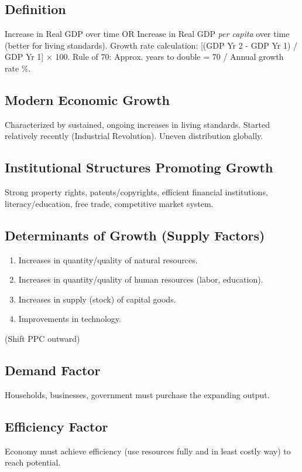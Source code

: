 \documentclass{article}
\begin{document}
\subsection*{Definition}
Increase in Real GDP over time OR Increase in Real GDP \textit{per capita} over time (better for living standards). Growth rate calculation: [(GDP Yr 2 - GDP Yr 1) / GDP Yr 1] $\times$ 100. Rule of 70: Approx. years to double = 70 / Annual growth rate \%.

\subsection*{Modern Economic Growth}
Characterized by sustained, ongoing increases in living standards. Started relatively recently (Industrial Revolution). Uneven distribution globally.

\subsection*{Institutional Structures Promoting Growth}
Strong property rights, patents/copyrights, efficient financial institutions, literacy/education, free trade, competitive market system.

\subsection*{Determinants of Growth (Supply Factors)}
\begin{enumerate}
    \item Increases in quantity/quality of natural resources.
    \item Increases in quantity/quality of human resources (labor, education).
    \item Increases in supply (stock) of capital goods.
    \item Improvements in technology.
\end{enumerate}
(Shift PPC outward)

\subsection*{Demand Factor}
Households, businesses, government must purchase the expanding output.

\subsection*{Efficiency Factor}
Economy must achieve efficiency (use resources fully and in least costly way) to reach potential.
\end{document}
